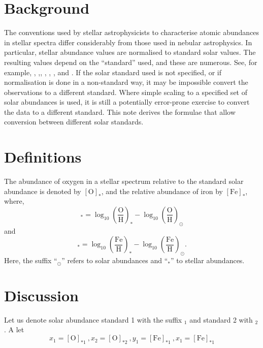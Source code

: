 \section{Background}

The conventions used by stellar astrophysicists to characterise atomic abundances in stellar spectra differ considerably from those used in nebular astrophysics.  In particular, stellar abundance values are normalised to standard solar values. The resulting values depend on the ``standard'' used, and these are numerous. See, for example, \cite{1989GeCoA..53..197A}, \cite{1998SSRv...85..161G},\cite{2007SSRv..130..105G}, \cite{2009ARA&A..47..481A}, \cite{2010Ap&SS.328..179G}, \cite{2015A&A...573A..25S}, \cite{2015A&A...573A..26S} and \cite{2015A&A...573A..27G}.  If the solar standard used is not specified, or if normalisation is done in a non-standard way, it may be impossible convert the observations to a different standard. Where simple scaling to a specified set of solar abundances is used, it is still a potentially error-prone exercise to convert the data to a different standard. This note derives the formulae that allow conversion between different solar standards.
  
\section{Definitions}
The abundance of oxygen in a stellar spectrum relative to the standard solar abundance is denoted by $[\text{O}]_*$, and the relative abundance of iron by $[\text{Fe}]_*$, where,
\begin{equation}
[\text{O}]_* = \log_{10}\left(\frac{\text{O}}{\text{H}}\right)_* - \log_{10}\left(\frac{\text{O}}{\text{H}}\right)_\odot
\end{equation}
and
\begin{equation}
[\text{Fe}]_* = \log_{10}\left(\frac{\text{Fe}}{\text{H}}\right)_* - \log_{10}\left(\frac{\text{Fe}}{\text{H}}\right)_\odot .
\end{equation}
Here, the suffix ``$_\odot$'' refers to solar abundances and ``$_*$'' to stellar abundances.

\section{Discussion}
Let us denote solar abundance standard 1 with the suffix $_1$ and standard 2 with $_2$. A let
\begin{equation}
x_1 = [\text{O}]_{*1}\ , x_2 = [\text{O}]_{*2}\ , y_1 = [\text{Fe}]_{*1}\ , x_1 = [\text{Fe}]_{*1} 
\end{equation}


  
  
  
  
  
  
  
  
  
  
  
  
  
  
  